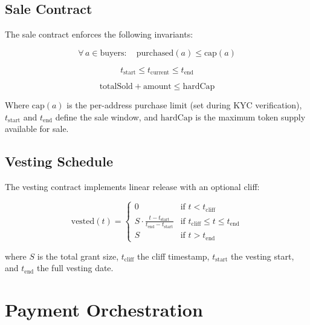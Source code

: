 \documentclass[11pt,a4paper]{article}
\begin{document}
\subsection{Sale Contract}

The sale contract enforces the following invariants:

\begin{equation}
    \forall\, a \in \text{buyers}: \quad \text{purchased}(a) \leq \text{cap}(a)
\end{equation}

\begin{equation}
    t_{\text{start}} \leq t_{\text{current}} \leq t_{\text{end}}
\end{equation}

\begin{equation}
    \text{totalSold} + \text{amount} \leq \text{hardCap}
\end{equation}

Where $\text{cap}(a)$ is the per-address purchase limit (set during KYC verification), $t_{\text{start}}$ and $t_{\text{end}}$ define the sale window, and $\text{hardCap}$ is the maximum token supply available for sale.

\subsection{Vesting Schedule}

The vesting contract implements linear release with an optional cliff:

\begin{equation}
    \text{vested}(t) = \begin{cases}
        0 & \text{if } t < t_{\text{cliff}} \\
        S \cdot \frac{t - t_{\text{start}}}{t_{\text{end}} - t_{\text{start}}} & \text{if } t_{\text{cliff}} \leq t \leq t_{\text{end}} \\
        S & \text{if } t > t_{\text{end}}
    \end{cases}
\end{equation}

where $S$ is the total grant size, $t_{\text{cliff}}$ the cliff timestamp, $t_{\text{start}}$ the vesting start, and $t_{\text{end}}$ the full vesting date.

\section{Payment Orchestration}
\end{document}
